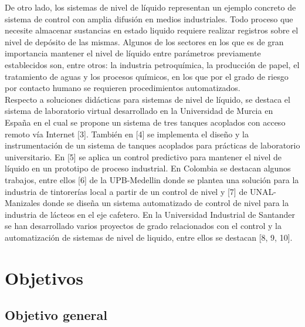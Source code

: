 \documentclass[a4paper,12pt,twoside]{proyectotanquesecci}
\begin{document}
De otro lado, los sistemas de nivel de líquido representan un ejemplo concreto de sistema de control con amplia difusión en medios industriales. Todo proceso que necesite almacenar sustancias en estado liquido requiere realizar registros sobre el nivel de depósito de las mismas. Algunos de los sectores en los que es de gran importancia mantener el nivel de líquido entre parámetros previamente establecidos son, entre otros: la industria petroquímica, la producción de papel, el tratamiento de aguas y los procesos químicos, en los que por el grado de riesgo por contacto humano se requieren procedimientos automatizados. \\

Respecto a soluciones didácticas para sistemas de nivel de líquido, se destaca el sistema de laboratorio virtual desarrollado en la Universidad de Murcia en España en el cual se propone un sistema de tres tanques acoplados con acceso remoto vía Internet [3]. También en [4] se implementa el diseño y la instrumentación de un sistema de tanques acoplados para prácticas de laboratorio universitario. En [5] se aplica un control predictivo para mantener el nivel de líquido en un prototipo de proceso industrial. En Colombia se destacan algunos trabajos, entre ellos [6] de la UPB-Medellin donde se plantea una solución para la industria de tintorerías local a partir de un control de nivel y [7] de UNAL-Manizales donde se diseña un sistema automatizado de control de nivel para la industria de lácteos en el eje cafetero. En la Universidad Industrial de Santander se han desarrollado varios proyectos de grado relacionados con el control y la automatización de sistemas de nivel de liquido, entre ellos se destacan [8, 9, 10]. \\






\chapter{Objetivos}

\section{Objetivo general}
\end{document}
